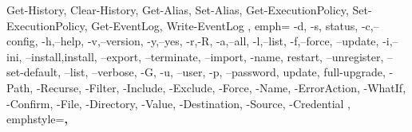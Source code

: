 {{		Get-History, Clear-History,
		Get-Alias, Set-Alias,
		Get-ExecutionPolicy, Set-ExecutionPolicy,
		Get-EventLog, Write-EventLog
	},
	emph={
		-d,
		-s, status,
		-c,--config,
		-h,--help,
		-v,--version,
		-y,--yes,
		-r,-R,
		-a,--all,
		-l,--list,
		-f,--force,
		--update,
		-i,--ini,
		--install,install,
		--export, --terminate,
		--import,
		-name,
		restart,
		--unregister,
		--set-default,
		--list,
		--verbose,
		-G,
		-u, --user,
		-p, --password,
		update, full-upgrade,
		-Path,
		-Recurse,
		-Filter,
		-Include,
		-Exclude,
		-Force,
		-Name,
		-ErrorAction,
		-WhatIf,
		-Confirm,
		-File,
		-Directory,
		-Value,
		-Destination,
		-Source,
		-Credential
	},
	emphstyle=\color{purple}\bfseries,
}


